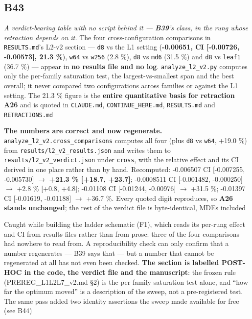 \documentclass[10pt]{article}
\begin{document}
\subsection*{B43}\label{led:B43}
\begin{description}[leftmargin=0pt,itemsep=1pt]
\item[Defect.] \emph{A verdict-bearing table with no script behind it --- \textbf{B39}'s class, in the rung whose retraction depends on it.} The four cross-configuration comparisons in \texttt{RESULTS.md}'s L2-v2 section --- \texttt{d8} vs the L1 setting (\textbf{-0.00651, CI [-0.00726, -0.00573], 21.3 \%}), \texttt{w64} vs \texttt{w256} (2.8 \%), \texttt{d8} vs \texttt{md6} (31.5 \%) and \texttt{d8} vs \texttt{leaf1} (36.7 \%) --- appear in \textbf{no results file and no log}. \texttt{analyze\_l2\_v2.py} computes only the per-family saturation test, the largest-vs-smallest span and the best overall; it never compared two configurations across families or against the L1 setting. The 21.3 \% figure is the \textbf{entire quantitative basis for retraction A26} and is quoted in \texttt{CLAUDE.md}, \texttt{CONTINUE\_HERE.md}, \texttt{RESULTS.md} and \texttt{RETRACTIONS.md}
\item[Resolution.] \textbf{The numbers are correct and now regenerate.} \texttt{analyze\_l2\_v2.cross\_comparisons} computes all four (plus \texttt{d8} vs \texttt{w64}, +19.0 \%) from \texttt{results/l2\_v2\_results.json} and writes them to \texttt{results/l2\_v2\_verdict.json} under \texttt{cross}, with the relative effect and its CI derived in one place rather than by hand. Recomputed: -0.006507 CI [-0.007255, -0.005730] $\rightarrow$ \textbf{+21.3 \% [+18.7, +23.7]}; -0.0008511 CI [-0.001482, -0.000250] $\rightarrow$ +2.8 \% [+0.8, +4.8]; -0.01108 CI [-0.01244, -0.00976] $\rightarrow$ +31.5 \%; -0.01397 CI [-0.01619, -0.01188] $\rightarrow$ +36.7 \%. Every quoted digit reproduces, so \textbf{A26 stands unchanged}; the rest of the verdict file is byte-identical, MDEs included
\item[Note.] Caught while building the ladder schematic (F1), which reads its per-rung effect and CI from results files rather than from prose: three of the four comparisons had nowhere to read from. A reproducibility check can only confirm that a number regenerates --- B39 says that --- but a number that cannot be regenerated at all has not even been checked. \textbf{The section is labelled POST-HOC in the code, the verdict file and the manuscript}: the frozen rule (PREREG\_L1L2L7\_v2.md §2) is the per-family saturation test alone, and ``how far the optimum moved'' is a description of the sweep, not a pre-registered test. The same pass added two identity assertions the sweep made available for free (see B44)
\end{description}
\end{document}
